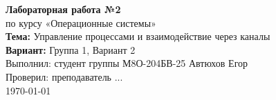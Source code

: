 \begin{titlepage}
    \centering
    \vspace*{1cm}
    {\Large \textbf{Лабораторная работа №2}}\\
    \vspace{0.5cm}
    {\large по курсу «Операционные системы»}\\
    \vspace{2cm}
    \textbf{Тема:} Управление процессами и взаимодействие через каналы\\
    \textbf{Вариант:} Группа 1, Вариант 2\\
    \vspace{2cm}
    Выполнил: студент группы М8О-204БВ-25 Автюхов Егор \\
    Проверил: преподаватель ... \\
    \vfill
    \today
\end{titlepage}